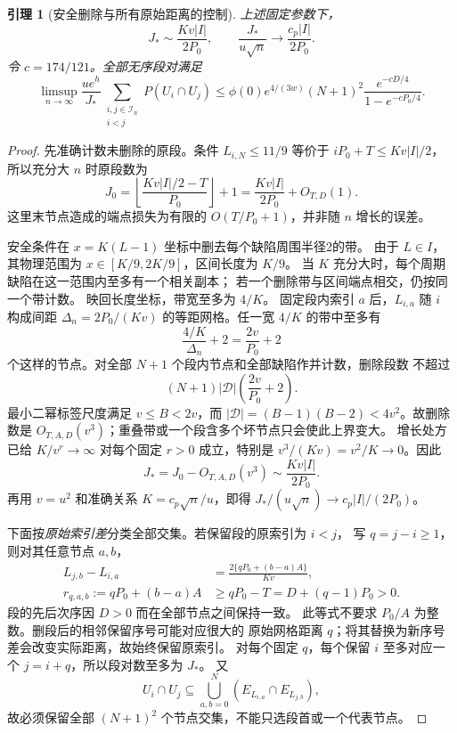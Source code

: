 \documentclass[UTF8,a4paper,11pt,fontset=fandol]{ctexart}
\newtheorem{lemma}{引理}[section]
\theoremstyle{remark}
\begin{document}
\begin{lemma}[安全删除与所有原始距离的控制]\label{lem:paperpackets}
上述固定参数下，
\[
 J_*\sim\frac{Kv|I|}{2P_0},\qquad
 \frac{J_*}{u\sqrt n}\longrightarrow\frac{c_p|I|}{2P_0}.
\]
令 $c=174/121$。全部无序段对满足
\[
 \limsup_{n\to\infty}\frac{ue^h}{J_*}
 \sum_{\substack{i,j\in\mathcal I_n\\i<j}}P(U_i\cap U_j)
 \le\phi(0)e^{4/(3w)}(N+1)^2
 \frac{e^{-cD/4}}{1-e^{-cP_0/4}}.
\]
\end{lemma}
\begin{proof}
先准确计数未删除的原段。条件 $L_{i,N}\le11/9$ 等价于
$iP_0+T\le Kv|I|/2$，所以充分大 $n$ 时原段数为
\[
 J_0=\left\lfloor\frac{Kv|I|/2-T}{P_0}\right\rfloor+1
 =\frac{Kv|I|}{2P_0}+O_{T,D}(1).
\]
这里末节点造成的端点损失为有限的 $O(T/P_0+1)$，并非随 $n$ 增长的误差。

安全条件在 $x=K(L-1)$ 坐标中删去每个缺陷周围半径2的带。
由于 $L\in I$，其物理范围为 $x\in[K/9,2K/9]$，区间长度为 $K/9$。
当 $K$ 充分大时，每个周期缺陷在这一范围内至多有一个相关副本；
若一个删除带与区间端点相交，仍按同一个带计数。
映回长度坐标，带宽至多为 $4/K$。
固定段内索引 $a$ 后，$L_{i,a}$ 随 $i$ 构成间距
$\Delta_n=2P_0/(Kv)$ 的等距网格。任一宽 $4/K$ 的带中至多有
\[
 \frac{4/K}{\Delta_n}+2=\frac{2v}{P_0}+2
\]
个这样的节点。对全部 $N+1$ 个段内节点和全部缺陷作并计数，删除段数
不超过
\[
 (N+1)|\mathcal D|\left(\frac{2v}{P_0}+2\right).
\]
最小二幂标签尺度满足 $v\le B<2v$，而
$|\mathcal D|=(B-1)(B-2)<4v^2$。故删除数是
$O_{T,A,D}(v^3)$；重叠带或一个段含多个坏节点只会使此上界变大。
增长处方已给 $K/v^r\to\infty$ 对每个固定 $r>0$ 成立，特别是
$v^3/(Kv)=v^2/K\to0$。因此
\[
 J_*=J_0-O_{T,A,D}(v^3)
 \sim\frac{Kv|I|}{2P_0}.
\]
再用 $v=u^2$ 和准确关系 $K=c_p\sqrt n/u$，即得
$J_* /(u\sqrt n)\to c_p|I|/(2P_0)$。

下面按\emph{原始索引差}分类全部交集。若保留段的原索引为 $i<j$，
写 $q=j-i\ge1$，则对其任意节点 $a,b$，
\begin{align*}
 L_{j,b}-L_{i,a}
 &=\frac{2\{qP_0+(b-a)A\}}{Kv},\\
 r_{q,a,b}:=qP_0+(b-a)A
 &\ge qP_0-T=D+(q-1)P_0>0.
\end{align*}
段的先后次序因 $D>0$ 而在全部节点之间保持一致。
此等式不要求 $P_0/A$ 为整数。删段后的相邻保留序号可能对应很大的
原始网格距离 $q$；将其替换为新序号差会改变实际距离，故始终保留原索引。
对每个固定 $q$，每个保留 $i$ 至多对应一个 $j=i+q$，所以段对数至多为 $J_*$。
又
\[
 U_i\cap U_j\subseteq
 \bigcup_{a,b=0}^N(E_{L_{i,a}}\cap E_{L_{j,b}}),
\]
故必须保留全部 $(N+1)^2$ 个节点交集，不能只选段首或一个代表节点。


\end{proof}
\end{document}
